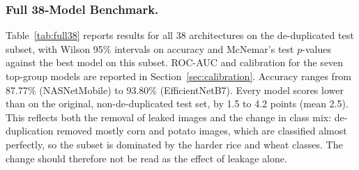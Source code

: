 \subsubsection{Full 38-Model Benchmark.}
Table~\ref{tab:full38} reports results for all 38 architectures on the de-duplicated test subset, with Wilson 95\% intervals on accuracy and McNemar's test $p$-values against the best model on this subset. ROC-AUC and calibration for the seven top-group models are reported in Section~\ref{sec:calibration}. Accuracy ranges from 87.77\% (NASNetMobile) to 93.80\% (EfficientNetB7). Every model scores lower than on the original, non-de-duplicated test set, by 1.5 to 4.2 points (mean 2.5). This reflects both the removal of leaked images and the change in class mix: de-duplication removed mostly corn and potato images, which are classified almost perfectly, so the subset is dominated by the harder rice and wheat classes. The change should therefore not be read as the effect of leakage alone.

